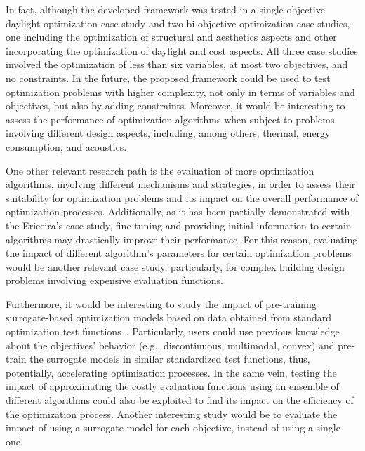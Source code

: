 In fact, although the developed framework was tested in a single-objective daylight optimization case study and two bi-objective optimization case studies, one including the optimization of structural and aesthetics aspects and other incorporating the optimization of daylight and cost aspects. All three case studies involved the optimization of less than six variables, at most two objectives, and no constraints. In the future, the proposed framework could be used to test optimization problems with higher complexity, not only in terms of variables and objectives, but also by adding constraints. Moreover, it would be interesting to assess the performance of optimization algorithms when subject to problems involving different design aspects, including, among others, thermal, energy consumption, and acoustics. 
 
One other relevant research path is the evaluation of more optimization algorithms, involving different mechanisms and strategies, in order to assess their suitability for optimization problems and its impact on the overall performance of optimization processes. Additionally, as it has been partially demonstrated with the Ericeira's case study, fine-tuning and providing initial information to certain algorithms may drastically improve their performance. For this reason, evaluating the impact of different algorithm's parameters for certain optimization problems would be another relevant case study, particularly, for complex building design problems involving expensive evaluation functions. 

Furthermore, it would be interesting to study the impact of pre-training surrogate-based optimization models based on data obtained from standard optimization test functions~\cite{Zhang2009TEST}. Particularly, users could use previous knowledge about the objectives' behavior (e.g., discontinuous, multimodal, convex) and pre-train the surrogate models in similar standardized test functions, thus, potentially, accelerating optimization processes. In the same vein, testing the impact of approximating the costly evaluation functions using an ensemble of different algorithms could also be exploited to find its impact on the efficiency of the optimization process. %
Another interesting study would be to evaluate the impact of using a surrogate model for each objective, instead of using a single one. 
